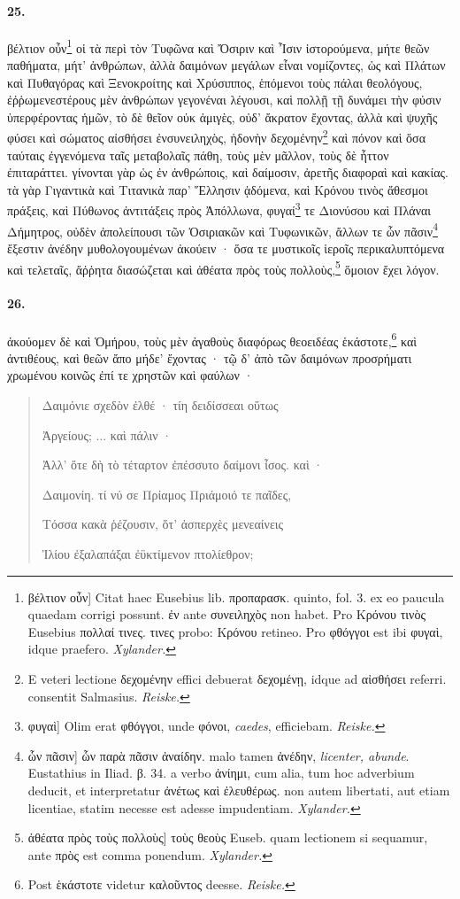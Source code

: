 \documentclass[a4paper, 11pt, oneside, polutonikogreek, german]{article}
\begin{document}
\paragraph{25.}
βέλτιον οὖν\footnote{βέλτιον οὖν] Citat haec Eusebius lib. προπαρασκ. quinto, fol. 3. ex eo paucula quaedam corrigi possunt. ἐν ante συνειληχὸς non habet. Pro Κρόνου τινὸς Eusebius πολλαί τινες. τινες probo: Κρόνου retineo. Pro φθόγγοι est ibi φυγαὶ, idque praefero. \emph{Xylander.}} οἱ τὰ περὶ τὸν Τυφῶνα καὶ Ὄσιριν καὶ Ἶσιν ἱστορούμενα, μήτε θεῶν παθήματα, μήτ' ἀνθρώπων, ἀλλὰ δαιμόνων μεγάλων εἶναι νομίζοντες, ὡς καὶ Πλάτων καὶ Πυθαγόρας καὶ Ξενοκροίτης καὶ Χρύσιππος, ἑπόμενοι τοὺς πάλαι θεολόγους, ἐῤῥωμενεστέρους μὲν ἀνθρώπων γεγονέναι λέγουσι, καὶ πολλῇ τῇ δυνάμει τὴν φύσιν ὑπερφέροντας ἡμῶν, τὸ δὲ θεῖον οὐκ ἀμιγὲς, οὐδ' ἄκρατον ἔχοντας, ἀλλὰ καὶ ψυχῆς φύσει καὶ σώματος αἰσθήσει ἐνσυνειληχὸς, ἡδονὴν δεχομένην\footnote{E veteri lectione δεχομένην effici debuerat δεχομένῃ, idque ad αἰσθήσει referri. consentit Salmasius. \emph{Reiske.}} καὶ πόνον καὶ ὅσα ταύταις ἐγγενόμενα ταῖς μεταβολαῖς πάθη, τοὺς μὲν μᾶλλον, τοὺς δὲ ἧττον ἐπιταράττει. γίνονται γὰρ ὡς ἐν ἀνθρώποις, καὶ δαίμοσιν, ἀρετῆς διαφοραὶ καὶ κακίας. τὰ γὰρ Γιγαντικὰ καὶ Τιτανικὰ παρ' Ἕλλησιν ᾀδόμενα, καὶ Κρόνου τινὸς ἄθεσμοι πράξεις, καὶ Πύθωνος ἀντιτάξεις πρὸς Ἀπόλλωνα, φυγαί\footnote{φυγαὶ] Olim erat φθόγγοι, unde φόνοι, \emph{caedes}, efficiebam. \emph{Reiske.}} τε Διονύσου καὶ Πλάναι Δήμητρος, οὐδὲν ἀπολείπουσι τῶν Ὀσιριακῶν καὶ Τυφωνικῶν, ἄλλων τε ὧν πᾶσιν\footnote{ὧν πᾶσιν] ὧν παρὰ πᾶσιν ἀναίδην. malo tamen ἀνέδην, \emph{licenter, abunde}. Eustathius in Iliad. β. 34. a verbo ἀνίημι, cum alia, tum hoc adverbium deducit, et interpretatur ἀνέτως καὶ ἐλευθέρως. non autem libertati, aut etiam licentiae, statim necesse est adesse impudentiam. \emph{Xylander.}} ἔξεστιν ἀνέδην μυθολογουμένων ἀκούειν · ὅσα τε μυστικοῖς ἱεροῖς περικαλυπτόμενα καὶ τελεταῖς, ἄῤῥητα διασώζεται καὶ ἀθέατα πρὸς τοὺς πολλοὺς,\footnote{ἀθέατα πρὸς τοὺς πολλοὺς] τοὺς θεοὺς Euseb. quam lectionem si sequamur, ante πρὸς est comma ponendum. \emph{Xylander.}} ὅμοιον ἔχει λόγον.

\paragraph{26.}
ἀκούομεν δὲ καὶ Ὁμήρου, τοὺς μὲν ἀγαθοὺς διαφόρως θεοειδέας ἑκάστοτε,\footnote{Post ἑκάστοτε videtur καλοῦντος deesse. \emph{Reiske.}} καὶ ἀντιθέους, καὶ θεῶν ἄπο μήδε' ἔχοντας · τῷ δ' ἀπὸ τῶν δαιμόνων προσρήματι χρωμένου κοινῶς ἐπί τε χρηστῶν καὶ φαύλων ·
\begin{quotation}\tiny
Δαιμόνιε σχεδὸν ἐλθέ · τίη δειδίσσεαι οὕτως

Ἀργείους; ... καὶ πάλιν ·

Ἀλλ' ὅτε δὴ τὸ τέταρτον ἐπέσσυτο δαίμονι ἶσος. καὶ ·

Δαιμονίη. τί νύ σε Πρίαμος Πριάμοιό τε παῖδες,

Τόσσα κακὰ ῥέζουσιν, ὅτ' ἀσπερχὲς μενεαίνεις

Ἰλίου ἐξαλαπάξαι ἐϋκτίμενον πτολίεθρον;
\end{quotation}
\end{document}
